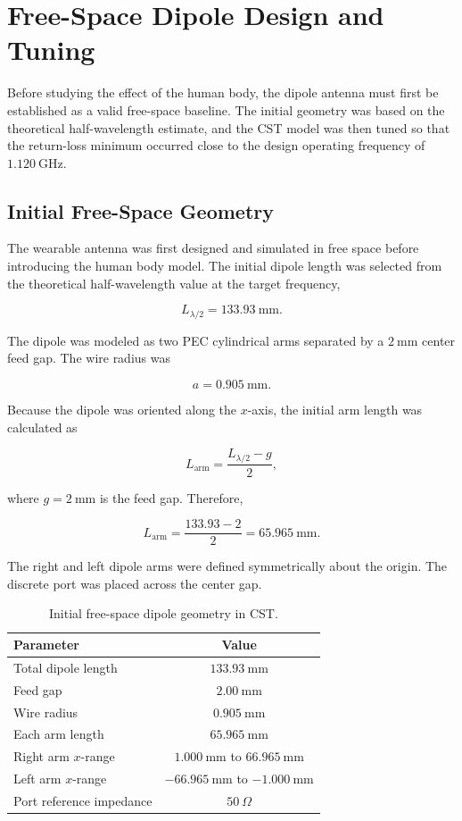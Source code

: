 \section{Free-Space Dipole Design and Tuning}

Before studying the effect of the human body, the dipole antenna must first be established as a valid free-space baseline. The initial geometry was based on the theoretical half-wavelength estimate, and the CST model was then tuned so that the return-loss minimum occurred close to the design operating frequency of \(1.120~\mathrm{GHz}\).

\subsection{Initial Free-Space Geometry}

The wearable antenna was first designed and simulated in free space before introducing the human body model. The initial dipole length was selected from the theoretical half-wavelength value at the target frequency,

\[
L_{\lambda/2} = 133.93~\mathrm{mm}.
\]

The dipole was modeled as two PEC cylindrical arms separated by a \(2~\mathrm{mm}\) center feed gap. The wire radius was

\[
a = 0.905~\mathrm{mm}.
\]

Because the dipole was oriented along the \(x\)-axis, the initial arm length was calculated as

\[
L_{\mathrm{arm}}
=
\frac{L_{\lambda/2}-g}{2},
\]

where \(g=2~\mathrm{mm}\) is the feed gap. Therefore,

\[
L_{\mathrm{arm}}
=
\frac{133.93-2}{2}
=
65.965~\mathrm{mm}.
\]

The right and left dipole arms were defined symmetrically about the origin. The discrete port was placed across the center gap.

\begin{table}[htbp]
\centering
\caption{Initial free-space dipole geometry in CST.}
\label{tab:initial-free-space-geometry}
\begin{tabular}{lc}
\hline
\textbf{Parameter} & \textbf{Value} \\
\hline
Total dipole length & \(133.93~\mathrm{mm}\) \\
Feed gap & \(2.00~\mathrm{mm}\) \\
Wire radius & \(0.905~\mathrm{mm}\) \\
Each arm length & \(65.965~\mathrm{mm}\) \\
Right arm \(x\)-range & \(1.000~\mathrm{mm}\) to \(66.965~\mathrm{mm}\) \\
Left arm \(x\)-range & \(-66.965~\mathrm{mm}\) to \(-1.000~\mathrm{mm}\) \\
Port reference impedance & \(50~\Omega\) \\
\hline
\end{tabular}
\end{table}

